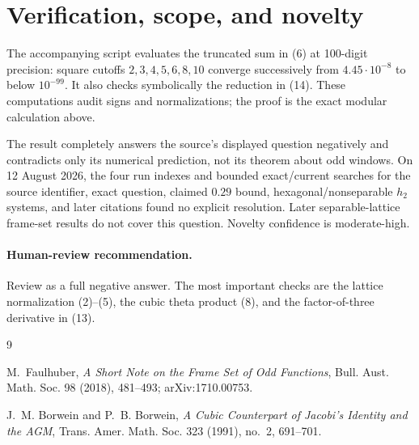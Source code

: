 \documentclass[11pt]{article}
\begin{document}
\section{Verification, scope, and novelty}

The accompanying script evaluates the truncated sum in (6) at 100-digit
precision: square cutoffs \(2,3,4,5,6,8,10\) converge successively from
\(4.45\cdot10^{-8}\) to below \(10^{-99}\).  It also checks symbolically
the reduction in (14).  These computations audit signs and normalizations;
the proof is the exact modular calculation above.

The result completely answers the source's displayed question negatively
and contradicts only its numerical prediction, not its theorem about odd
windows.  On 12 August 2026, the four run indexes and bounded exact/current
searches for the source identifier, exact question, claimed \(0.29\) bound,
hexagonal/nonseparable \(h_2\) systems, and later citations found no explicit
resolution.  Later separable-lattice frame-set results do not cover this
question.  Novelty confidence is moderate-high.

\paragraph{Human-review recommendation.}
Review as a full negative answer.  The most important checks are the lattice
normalization (2)--(5), the cubic theta product (8), and the factor-of-three
derivative in (13).

\begin{thebibliography}{9}

M.~Faulhuber,
\emph{A Short Note on the Frame Set of Odd Functions},
Bull. Aust. Math. Soc. 98 (2018), 481--493; arXiv:1710.00753.

J.~M. Borwein and P.~B. Borwein,
\emph{A Cubic Counterpart of Jacobi's Identity and the AGM},
Trans. Amer. Math. Soc. 323 (1991), no.~2, 691--701.

\end{thebibliography}
\end{document}
